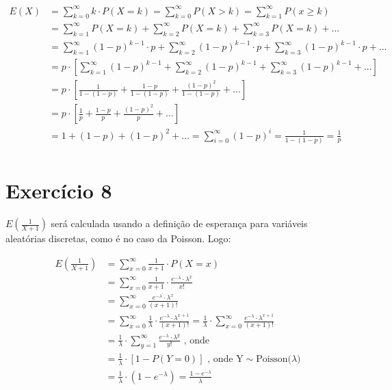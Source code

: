 \documentclass[12pt,letterpaper]{article}
\begin{document}
	\begin{equation*}
		\begin{split}
			E(X) & = \sum_{k=0}^{\infty} k \cdot P(X=k) = \sum_{k=0}^{\infty} P(X>k) = \sum_{k=1}^{\infty} P(x \geq k)\\ 
			& = \sum_{k=1}^{\infty} P(X=k) + \sum_{k=2}^{\infty} P(X=k) + \sum_{k=3}^{\infty} P(X=k) +... \\
			& = \sum_{k=1}^{\infty} (1-p)^{k-1} \cdot p + \sum_{k=2}^{\infty} (1-p)^{k-1} \cdot p + \sum_{k=3}^{\infty} (1-p)^{k-1} \cdot p + ... \\
			& = p \cdot [\sum_{k=1}^{\infty} (1-p)^{k-1} + \sum_{k=2}^{\infty} (1-p)^{k-1} + \sum_{k=3}^{\infty} (1-p)^{k-1} + ...]\\
			& = p \cdot [\frac{1}{1-(1-p)} + \frac{1-p}{1-(1-p)} + \frac{(1-p)^2}{1-(1-p)} + ...]\\
			& = p \cdot [\frac{1}{p} + \frac{1-p}{p} + \frac{(1-p)^2}{p} + ...]\\
			& = 1 + (1-p) + (1-p)^2 + ... = \sum_{i = 0}^{\infty} (1-p)^i = \frac{1}{1-(1-p)} = \frac{1}{p}\\
		\end{split}
	\end{equation*}
	
	\section*{Exercício 8}
	
	$E(\frac{1}{X+1})$ será calculada usando a definição de esperança para variáveis aleatórias discretas, como é no caso da Poisson. Logo:
	
	\begin{equation*}
		\begin{split}
			E(\frac{1}{X+1}) & = \sum_{x=0}^{\infty} \frac{1}{x+1} \cdot P(X=x)\\
			& = \sum_{x=0}^{\infty} \frac{1}{x+1} \cdot \frac{e^{-\lambda}\cdot \lambda^x}{x!} \\
			& = \sum_{x=0}^{\infty} \frac{e^{-\lambda}\cdot \lambda^x}{(x+1)!} \\
			& = \sum_{x=0}^{\infty}\frac{1}{\lambda} \cdot \frac{e^{-\lambda}\cdot \lambda^{x+1}}{(x+1)!} = \frac{1}{\lambda} \cdot \sum_{x=0}^{\infty} \frac{e^{-\lambda}\cdot \lambda^{x+1}}{(x+1)!} \\
			& = \frac{1}{\lambda} \cdot \sum_{y=1}^{\infty} \frac{e^{-\lambda}\cdot \lambda^y}{y!} \text{ , onde }\\
			& = \frac{1}{\lambda} \cdot [1-P(Y=0)] \text{ , onde Y$\sim$Poisson($\lambda$)} \\ 
			& = \frac{1}{\lambda} \cdot (1 - e^{-\lambda}) = \frac{1 - e^{-\lambda}}{\lambda} 
	\end{split}
	\end{equation*}
	
	
\end{document}
